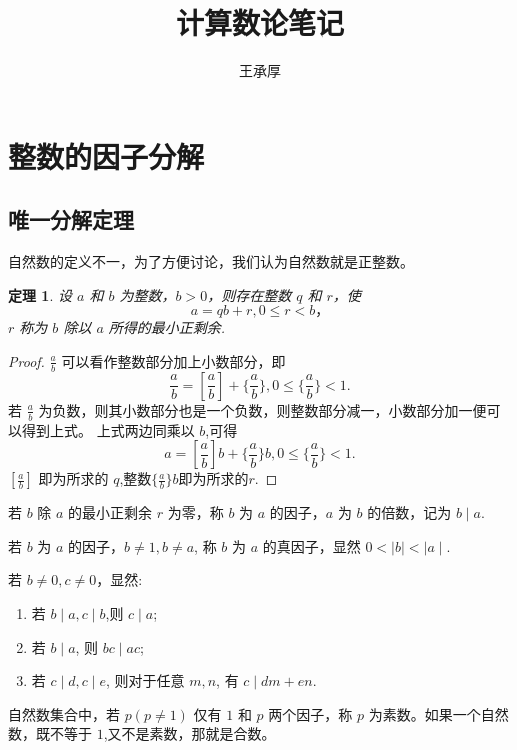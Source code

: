 \documentclass[11pt]{ctexart}
\title{计算数论笔记}
\author{王承厚}
\newtheorem{theorem}{\indent 定理}[section]
\begin{document}
\maketitle
\section{整数的因子分解}
\subsection{唯一分解定理}
自然数的定义不一，为了方便讨论，我们认为自然数就是正整数。
\begin{theorem}
    设 $a$ 和 $b$ 为整数，$b>0$，则存在整数 $q$ 和 $r$，使
    \[
        a = qb + r, 0 \leq r < b，
    \]
    $r$ 称为 $b$ 除以 $a$ 所得的最小正剩余.
\end{theorem}
\begin{proof}
    $\frac{a}{b}$ 可以看作整数部分加上小数部分，即
    \[
        \frac{a}{b} = [\frac{a}{b}] + \{\frac{a}{b}\}, 0 \leq  \{\frac{a}{b}\} < 1.
    \]
    若 $\frac{a}{b}$ 为负数，则其小数部分也是一个负数，则整数部分减一，小数部分加一便可以得到上式。
    上式两边同乘以 $b$,可得
    \[
        a = [\frac{a}{b}]b + \{\frac{a}{b}\}b, 0 \leq \{\frac{a}{b}\} < 1.
    \]
    $[\frac{a}{b}]$ 即为所求的 $q$,整数$\{\frac{a}{b}\}b$即为所求的$r$.
\end{proof}

若 $b$ 除 $a$ 的最小正剩余 $r$ 为零，称 $b$ 为 $a$ 的因子，$a$ 为 $b$ 的倍数，记为 $b\mid a$.

若 $b$ 为 $a$ 的因子，$b \neq 1,b \neq a $, 称 $b$ 为 $a$ 的真因子，显然 $0 < \mid b \mid < \mid a \mid $.

若 $b \neq 0, c \neq 0$，显然:
\begin{enumerate}
    \item 若 $b \mid a, c \mid b$,则 $c \mid a$;
    \item 若 $b \mid a$, 则 $bc \mid ac$;
    \item 若 $c \mid d, c \mid e$, 则对于任意 $m,n$, 有 $c \mid dm+en$.
\end{enumerate}

自然数集合中，若 $p(p \neq 1)$ 仅有 $1$ 和 $p$ 两个因子，称 $p$ 为素数。如果一个自然数，既不等于 $1$,又不是素数，那就是合数。
\end{document}
